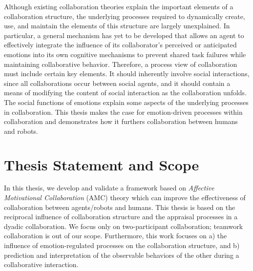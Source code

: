 \documentclass[12pt]{report}
\begin{document}
Although existing collaboration theories explain the important elements of a
collaboration structure, the underlying processes required to dynamically
create, use, and maintain the elements of this structure are largely
unexplained. In particular, a general mechanism has yet to be developed that
allows an agent to effectively integrate the influence of its collaborator's
perceived or anticipated emotions into its own cognitive mechanisms to prevent
shared task failures while maintaining collaborative behavior. Therefore, a
process view of collaboration must include certain key elements. It should
inherently involve social interactions, since all collaborations occur between
social agents, and it should contain a means of modifying the content of social
interaction as the collaboration unfolds. The social functions of emotions
explain some aspects of the underlying processes in collaboration. This thesis
makes the case for emotion-driven processes within collaboration and
demonstrates how it furthers collaboration between humans and robots.

\section{Thesis Statement and Scope}

In this thesis, we develop and validate a framework based on \textit{Affective
Motivational Collaboration} (AMC) theory which can improve the effectiveness of
collaboration between agents/robots and humans. This thesis is based on the
reciprocal influence of collaboration structure and the appraisal processes in a
dyadic collaboration. We focus only on two-participant collaboration; teamwork
collaboration is out of our scope. Furthermore, this work focuses on a) the
influence of emotion-regulated processes on the collaboration structure, and b)
prediction and interpretation of the observable behaviors of the other during a
collaborative interaction.
\end{document}
